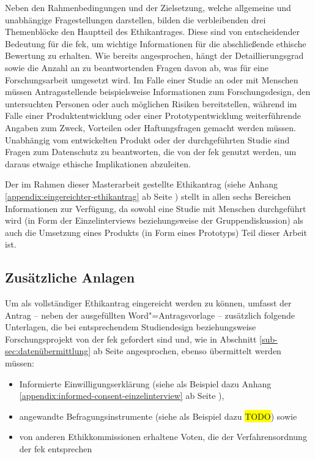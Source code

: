 \documentclass[a4paper,12pt,twoside]{scrreprt}
\begin{document}
\medskip

Neben den Rahmenbedingungen und der Zielsetzung, welche allgemeine und unabhängige Fragestellungen darstellen, bilden die verbleibenden drei Themenblöcke den Hauptteil des Ethikantrages. Diese sind von entscheidender Bedeutung für die \ac{fek}, um wichtige Informationen für die abschließende ethische Bewertung zu erhalten. Wie bereits angesprochen, hängt der Detaillierungsgrad sowie die Anzahl an zu beantwortenden Fragen davon ab, was für eine Forschungsarbeit umgesetzt wird. Im Falle einer Studie an oder mit Menschen müssen Antragsstellende beispielsweise Informationen zum Forschungsdesign, den untersuchten Personen oder auch möglichen Risiken bereitstellen, während im Falle einer Produktentwicklung oder einer Prototypentwicklung weiterführende Angaben zum Zweck, Vorteilen oder Haftungsfragen gemacht werden müssen. Unabhängig vom entwickelten Produkt oder der durchgeführten Studie sind Fragen zum Datenschutz zu beantworten, die von der \ac{fek} genutzt werden, um daraus etwaige ethische Implikationen abzuleiten.

Der im Rahmen dieser Masterarbeit gestellte Ethikantrag (siehe Anhang \ref{appendix:eingereichter-ethikantrag} ab Seite \pageref{appendix:eingereichter-ethikantrag}) stellt in allen sechs Bereichen Informationen zur Verfügung, da sowohl eine Studie mit Menschen durchgeführt wird (in Form der Einzelinterviews beziehungsweise der Gruppendiskussion) als auch die Umsetzung eines Produkts (in Form eines Prototyps) Teil dieser Arbeit ist.

\subsection{Zusätzliche Anlagen}
\label{sub-sec:inhaltlicher-aufbau-zusätzliche-anlagen}

Um als vollständiger Ethikantrag eingereicht werden zu können, umfasst der Antrag -- neben der ausgefüllten Word"=Antragsvorlage -- zusätzlich folgende Unterlagen, die bei entsprechendem Studiendesign beziehungsweise Forschungsprojekt von der \ac{fek} gefordert sind \cite{fachhochschule_vorarlberg_gmbh_forschungsethik-kommission_2021} und, wie in Abschnitt \ref{sub-sec:datenübermittlung} ab Seite \pageref{sub-sec:datenübermittlung} angesprochen, ebenso übermittelt werden müssen:
\begin{itemize}
    \item Informierte Einwilligungserklärung (siehe als Beispiel dazu Anhang \ref{appendix:informed-consent-einzelinterview} ab Seite \pageref{appendix:informed-consent-einzelinterview}),
    \item angewandte Befragungsinstrumente (siehe als Beispiel dazu \colorbox{yellow}{TODO}) sowie
    \item von anderen Ethikkommissionen erhaltene Voten, die der Verfahrensordnung der \ac{fek} entsprechen
\end{itemize}
\end{document}
